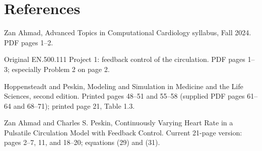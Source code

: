 \documentclass[11pt,letterpaper]{article}
\theoremstyle{definition}\newtheorem{definition}{Definition}\newtheorem{example}{Example}
\numberwithin{equation}{section}
\begin{document}
\section*{References}
\noindent\begin{minipage}{\linewidth}
Zan Ahmad, Advanced Topics in Computational Cardiology syllabus, Fall 2024. PDF pages 1--2.

\end{minipage}\par\medskip
\noindent\begin{minipage}{\linewidth}
Original EN.500.111 Project 1: feedback control of the circulation. PDF pages 1--3; especially Problem 2 on page 2.

\end{minipage}\par\medskip
\noindent\begin{minipage}{\linewidth}
Hoppensteadt and Peskin, Modeling and Simulation in Medicine and the Life Sciences, second edition. Printed pages 48--51 and 55--58 (supplied PDF pages 61--64 and 68--71); printed page 21, Table 1.3.

\end{minipage}\par\medskip
\noindent\begin{minipage}{\linewidth}
Zan Ahmad and Charles S. Peskin, Continuously Varying Heart Rate in a Pulsatile Circulation Model with Feedback Control. Current 21-page version: pages 2--7, 11, and 18--20; equations (29) and (31).

\end{minipage}\par\medskip
\end{document}
